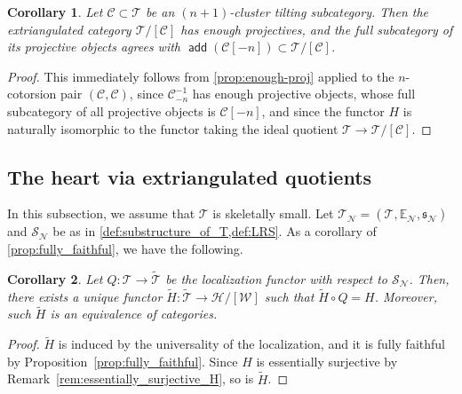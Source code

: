\documentclass[a4paper,reqno,10pt]{amsart}
\DeclareRobustCommand{\darkblueedit}[1]{#1}
\newtheorem{corollary}[corollary]{Corollary}
\theoremstyle{definition}
\theoremstyle{definition}
\theoremstyle{definition}
\theoremstyle{definition}
\theoremstyle{plain}
\def\add{\operatorname{\mathsf{add}}}
\newcommand{\fs}{\mathfrak{s}}
\newcommand{\BE}{\mathbb{E}}
\newcommand{\CC}{\mathcal{C}}
\newcommand{\CH}{\mathcal{H}}
\newcommand{\CN}{\mathcal{N}}
\newcommand{\CT}{\mathcal{T}}
\newcommand{\CW}{\mathcal{W}}
\renewcommand{\SS}{\mathscr{S}}
\begin{document}
\begin{corollary}
Let $\CC\subset\CT$ be an $(n+1)$-cluster tilting subcategory. Then the extriangulated category $\CT/[\CC]$ has enough projectives, and the full subcategory of its projective objects agrees with \darkblueedit{$\add(\CC[-n])\subset\CT/[\CC]$}.
\end{corollary}
\begin{proof}
This immediately follows from \cref{prop:enough-proj} applied to the $n$-cotorsion pair $(\CC,\CC)$, since $\CC_{-n}^{-1}$ has enough projective objects, whose full subcategory of all projective objects is $\CC[-n]$, and since the functor $H$ is naturally isomorphic to the functor taking the ideal quotient $\CT\to\CT/[\CC]$.
\end{proof}

\normalcolor

\subsection{The heart via extriangulated quotients}\label{subsec:via_extri_quotient}



In this subsection, we assume that $\CT$ is skeletally small.
Let $\CT_{\CN}=(\CT,\BE_\CN,\fs_\CN)$ and $\SS_{\CN}$ be as in \cref{def:substructure_of_T,def:LRS}.
As a corollary of \cref{prop:fully_faithful}, we have the following.
\begin{corollary}\label{cor:equiv_by_H}
Let
\color{blue}
$Q\colon\CT\to\widetilde{\CT}$ be the localization functor with respect to $\SS_{\CN}$. %
Then, there exists a unique functor $\widetilde{H}\colon\widetilde{\CT}\to\CH/[\CW]$ such that $\widetilde{H}\circ Q=H$. Moreover, such $\widetilde{H}$ is an equivalence of categories.
\normalcolor
\end{corollary}
\begin{proof}
$\widetilde{H}$ is induced by the universality of the localization, and it is fully faithful by Proposition~\ref{prop:fully_faithful}.
Since $H$ is essentially surjective by Remark~\ref{rem:essentially_surjective_H}, so is
$\widetilde{H}$.
\end{proof}
\end{document}

